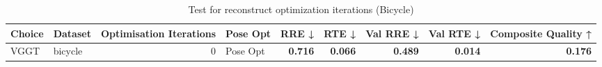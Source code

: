 \begin{table}[H]
\caption{Test for reconstruct optimization iterations (Bicycle)}
\label{tab:99_optimisation_iterations_bicycle}
\centering
\scriptsize
\begin{tabular}{llrlrrrrr}
\toprule
Choice & Dataset & Optimisation Iterations & Pose Opt & RRE ↓ & RTE ↓ & Val RRE ↓ & Val RTE ↓ & Composite Quality ↑ \\
\midrule
VGGT & bicycle & 0 & Pose Opt & \textbf{0.716} & \textbf{0.066} & \textbf{0.489} & \textbf{0.014} & \textbf{0.176} \\
\bottomrule
\end{tabular}
\end{table}